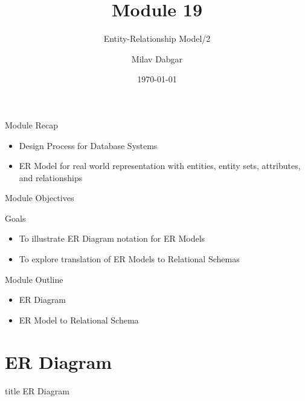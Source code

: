 \documentclass[aspectratio=169, xcolor=dvipsnames]{beamer}
\title{Module 19}
\subtitle{Entity-Relationship Model/2}
\author{Milav Dabgar}
\institute{www.milav.in}
\date{\today}
\begin{document}
\begin{frame}
    \titlepage
\end{frame}

\begin{frame}{Module Recap}
    \begin{itemize}[<+->]
        \item Design Process for Database Systems
        \item ER Model for real world representation with entities, entity sets, attributes, and relationships
    \end{itemize}
\end{frame}

\begin{frame}{Module Objectives}
    \begin{block}{Goals}
        \begin{itemize}[<+->]
            \item To illustrate ER Diagram notation for ER Models
            \item To explore translation of ER Models to Relational Schemas
        \end{itemize}
    \end{block}
\end{frame}

\begin{frame}{Module Outline}
    \begin{itemize}[<+->]
        \item ER Diagram
        \item ER Model to Relational Schema
    \end{itemize}
\end{frame}

\section{ER Diagram}
\begin{frame}
  \vfill
  \centering
  \begin{beamercolorbox}[sep=8pt,center,shadow=true,rounded=true]{title}
    ER Diagram\par%
  \end{beamercolorbox}
  \vfill
\end{frame}
\end{document}
